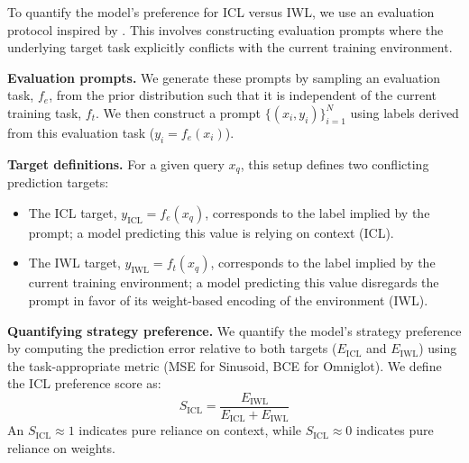 To quantify the model's preference for ICL versus IWL, we use an evaluation protocol inspired by \citet{chan2022data}. This involves constructing evaluation prompts where the underlying target task explicitly conflicts with the current training environment.

\textbf{Evaluation prompts.} We generate these prompts by sampling an evaluation task, $f_e$, from the prior distribution such that it is independent of the current training task, $f_t$. We then construct a prompt $\{(x_i, y_i)\}_{i=1}^N$ using labels derived from this evaluation task ($y_i = f_e(x_i)$).

\textbf{Target definitions.} For a given query $x_q$, this setup defines two conflicting prediction targets:
\begin{itemize}
    \item The ICL target, $y_\text{ICL}=f_e(x_q)$, corresponds to the label implied by the prompt; a model predicting this value is relying on context (ICL).
    \item The IWL target, $y_\text{IWL}=f_t(x_q)$, corresponds to the label implied by the current training environment; a model predicting this value disregards the prompt in favor of its weight-based encoding of the environment (IWL).
\end{itemize}

\textbf{Quantifying strategy preference.} We quantify the model's strategy preference by computing the prediction error relative to both targets ($E_\text{ICL}$ and $E_\text{IWL}$) using the task-appropriate metric (MSE for Sinusoid, BCE for Omniglot). We define the ICL preference score as:
\begin{equation}S_\text{ICL} = \frac{E_\text{IWL}}{E_\text{ICL} + E_\text{IWL}}\label{eq:s_icl_preference}\end{equation}
An $S_\text{ICL} \approx 1$ indicates pure reliance on context, while $S_\text{ICL} \approx 0$ indicates pure reliance on weights.


